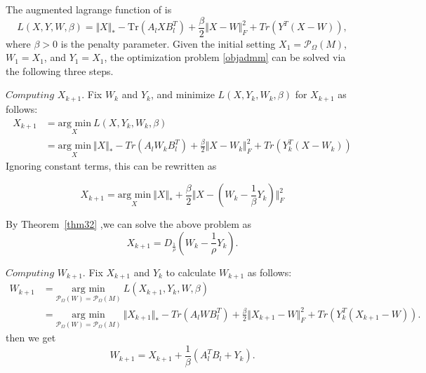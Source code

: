 \documentclass{article}
\begin{document}
{The augmented lagrange function of is 
\begin{equation}
	L(X,Y,W,\beta) = \Vert X \Vert_* - \text{Tr}(A_l X B_l^T) + \frac{\beta}{2}\Vert X-W \Vert_F^2 + Tr(Y^T(X-W)),
\end{equation}
where $\beta > 0$ is  the penalty parameter. Given the initial setting $X_1 = \mathcal{P}_\Omega(M)$, $W_1 = X_1$, and $Y_1 =  X_1$, the optimization problem \eqref{objadmm} can be solved via the following three steps.

$\textit{Computing}$  $X_{k+1}$. Fix $W_k$ and $Y_k$, and minimize $L(X,Y_k,W_k,\beta)$ for $X_{k+1}$ as follows:
\begin{equation}
\begin{aligned}
	X_{k+1} & =\underset{X}{\text{arg min}}\ L(X,Y_k,W_k,\beta) \\
	& =  \underset{X}{\text{arg min}} \ \Vert X\Vert_* - Tr(A_l W_k B_l^T)    + \frac{\beta}{2}\Vert X-W_k \Vert_F^2 + Tr(Y_k^T(X-W_k))
\end{aligned}
\end{equation}
Ignoring constant terms, this can be rewritten as 

\begin{equation}
	X_{k+1} = \underset{X}{\text{arg min}} \ \Vert X\Vert_* + \frac{\beta}{2} \Vert X-\left(W_k - \frac{1}{\beta}Y_k \right) \Vert_F^2
\end{equation}


By Theorem~\ref{thm32} ,we can solve the above problem as
\begin{equation}
	\label{admmx}
X_{k+1} = D_{\frac{1}{\rho}}(W_k - \frac{1}{\rho}Y_k).
\end{equation}


$\textit{Computing}$  $W_{k+1}$. Fix $X_{k+1}$ and $Y_k$ to calculate $W_{k+1}$ as follows:
\begin{equation}
\begin{aligned}
	W_{k+1}& = \underset{\mathcal{P}_{\Omega}(W) = \mathcal{P}_{\Omega}(M)}{\text{arg min}} \ L(X_{k+1},Y_k,W,\beta) \\
	& =  \underset{\mathcal{P}_{\Omega}(W) = \mathcal{P}_{\Omega}(M)}{\text{arg min}} \ \Vert X_{k+1}\Vert_* - Tr(A_l W B_l^T)    + \frac{\beta}{2}\Vert X_{k+1}-W \Vert_F^2 + Tr(Y_k^T(X_{k+1}-W)).
\end{aligned}
\end{equation}
then we get
\begin{equation}
	W_{k+1} = X_{k+1} + \frac{1}{\beta}(A_l^TB_l + Y_k).
\end{equation}

}
\end{document}
